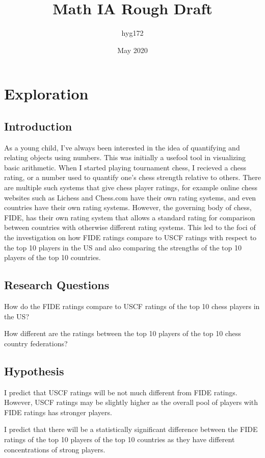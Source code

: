 \documentclass[12pt]{article}
\title{Math IA Rough Draft}
\author{hyg172}
\date{May 2020}
\begin{document}
\maketitle

\tableofcontents
\newpage

\section{Exploration}
\subsection{Introduction}
As a young child, I've always been interested in the idea of quantifying and relating objects using numbers. This was initially a usefool tool in visualizing basic arithmetic. When I started playing tournament chess, I recieved a chess rating, or a number used to quantify one's chess strength relative to others. There are multiple such systems that give chess player ratings, for example online chess websites such as Lichess and Chess.com have their own rating systems, and even countries have their own rating systems. However, the governing body of chess, FIDE, has their own rating system that allows a standard rating for comparison between countries with otherwise different rating systems. This led to the foci of the investigation on how FIDE ratings compare to USCF ratings with respect to the top 10 players in the US and also comparing the strengths of the top 10 players of the top 10 countries.
\subsection{Research Questions}
How do the FIDE ratings compare to USCF ratings of the top 10 chess players in the US?

How different are the ratings between the top 10 players of the top 10 chess country federations?
\subsection{Hypothesis}
I predict that USCF ratings will be not much different from FIDE ratings. However, USCF ratings may be slightly higher as the overall pool of players with FIDE ratings has stronger players.

I predict that there will be a statistically significant difference between the FIDE ratings of the top 10 players of the top 10 countries as they have different concentrations of strong players. 
\end{document}
